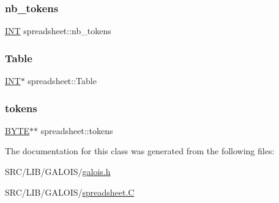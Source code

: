\mbox{\label{classspreadsheet_a6226efe57e0906c34ba532bf4634112a}} 
\subsubsection{\texorpdfstring{nb\+\_\+tokens}{nb\_tokens}}
{\footnotesize\ttfamily \mbox{\hyperlink{galois_8h_a09fddde158a3a20bd2dcadb609de11dc}{I\+NT}} spreadsheet\+::nb\+\_\+tokens}

\mbox{\label{classspreadsheet_a8b3b507fc2767371b443b9fe380804cb}} 
\subsubsection{\texorpdfstring{Table}{Table}}
{\footnotesize\ttfamily \mbox{\hyperlink{galois_8h_a09fddde158a3a20bd2dcadb609de11dc}{I\+NT}}$\ast$ spreadsheet\+::\+Table}

\mbox{\label{classspreadsheet_a8acb382067a33659e785e31966efedcf}} 
\subsubsection{\texorpdfstring{tokens}{tokens}}
{\footnotesize\ttfamily \mbox{\hyperlink{galois_8h_ab6cc7b4aeb6ea31aba2b3fbfc83ff5e6}{B\+Y\+TE}}$\ast$$\ast$ spreadsheet\+::tokens}



The documentation for this class was generated from the following files\+:\begin{DoxyCompactItemize}
\item 
S\+R\+C/\+L\+I\+B/\+G\+A\+L\+O\+I\+S/\mbox{\hyperlink{galois_8h}{galois.\+h}}\item 
S\+R\+C/\+L\+I\+B/\+G\+A\+L\+O\+I\+S/\mbox{\hyperlink{spreadsheet_8_c}{spreadsheet.\+C}}\end{DoxyCompactItemize}
